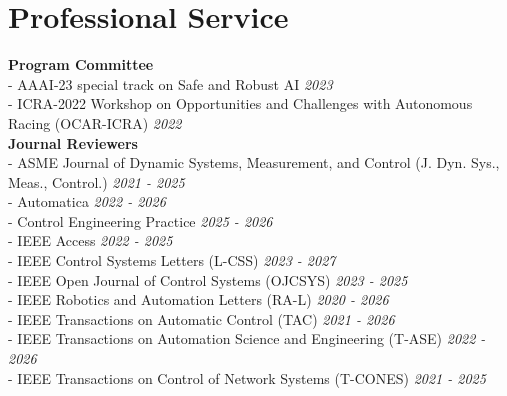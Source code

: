 \documentclass[letterpaper,10pt]{article}
\begin{document}
\section{Professional Service}

\hspace*{0.5cm} \textbf{Program Committee} \\
\hspace*{0.5cm} - AAAI-23 special track on Safe and Robust AI \hfill \emph{2023} \\
\hspace*{0.5cm} - ICRA-2022 Workshop on Opportunities and Challenges with Autonomous Racing (OCAR-ICRA)  \hfill \emph{2022} \\

\hspace*{0.5cm} \textbf{Journal Reviewers} \\
\hspace*{0.5cm} - ASME Journal of Dynamic Systems, Measurement, and Control (J. Dyn. Sys., Meas., Control.) \hfill \emph{2021 - 2025} \\
\hspace*{0.5cm} - Automatica \hfill \emph{2022 - 2026} \\
\hspace*{0.5cm} - Control Engineering Practice \hfill \emph{2025 - 2026} \\
\hspace*{0.5cm} - IEEE Access \hfill \emph{2022 - 2025} \\
\hspace*{0.5cm} - IEEE Control Systems Letters (L-CSS) \hfill \emph{2023 - 2027} \\
\hspace*{0.5cm} - IEEE Open Journal of Control Systems (OJCSYS) \hfill \emph{2023 - 2025} \\
\hspace*{0.5cm} - IEEE Robotics and Automation Letters (RA-L) \hfill \emph{2020 - 2026} \\
\hspace*{0.5cm} - IEEE Transactions on Automatic Control (TAC) \hfill \emph{2021 - 2026} \\
\hspace*{0.5cm} - IEEE Transactions on Automation Science and Engineering (T-ASE) \hfill \emph{2022 - 2026} \\
\hspace*{0.5cm} - IEEE Transactions on Control of Network Systems (T-CONES) \hfill \emph{2021 - 2025} \\
\end{document}
